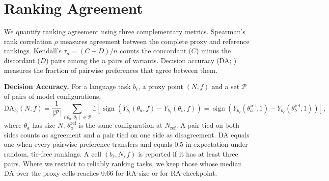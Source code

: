 \clearpage

\section{Ranking Agreement}
\label{app:ranking-agreement}

We quantify ranking agreement using three complementary metrics. Spearman's rank correlation $\rho$ measures agreement between the complete proxy and reference rankings.
Kendall's $\tau_a = (C-D)/n$ counts the concordant ($C$) minus the discordant ($D$) pairs among the $n$ pairs of variants.
Decision accuracy (DA; \citealp{heineman_signal_2025}) measures the fraction of pairwise preferences that agree between them.

\textbf{Decision Accuracy.} For a language task $b_\ell$, a proxy point $(N,f)$ and a set $\mathcal{P}$ of pairs of model configurations,
\begin{equation}
\mathrm{DA}_{b_\ell}(N,f)
=
\frac{1}{|\mathcal{P}|}
\sum_{(\theta_a,\theta_b)\in\mathcal{P}}
\mathbb{1}
\left[
\operatorname{sign}\!\left(Y_{b_\ell}(\theta_a,f)-Y_{b_\ell}(\theta_b,f)\right)
=
\operatorname{sign}\!\left(Y_{b_\ell}(\theta_a^{\mathrm{ref}},1)-Y_{b_\ell}(\theta_b^{\mathrm{ref}},1)\right)
\right],
\label{eq:decision-accuracy}
\end{equation}
where $\theta_a$ has size $N$, $\theta_a^{\mathrm{ref}}$ is the same configuration at $N_{\mathrm{ref}}$. A pair tied on both sides counts as agreement and a pair tied on one side as disagreement. DA equals one when every pairwise preference transfers and equals $0.5$ in expectation under random, tie-free rankings. 
A cell $(b_\ell, N, f)$ is reported if it has at least three pairs.
Where we restrict to reliably ranking tasks, we keep those whose median DA over the proxy cells reaches 0.66 for RA-size or for RA-checkpoint.
